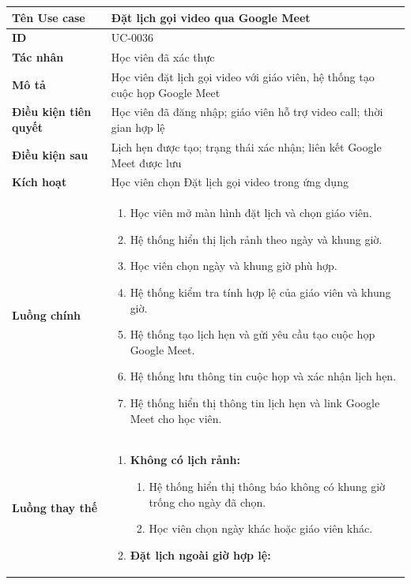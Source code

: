 {
\small
\renewcommand{\arraystretch}{1.15}

\begin{tabularx}{\textwidth}{|>{\raggedright\arraybackslash}p{3.5cm}|>{\raggedright\arraybackslash}X|}
\hline
\textbf{Tên Use case} & Đặt lịch gọi video qua Google Meet \\
\hline
\textbf{ID} & UC-0036 \\
\hline
\textbf{Tác nhân} & Học viên đã xác thực \\
\hline
\textbf{Mô tả} & Học viên đặt lịch gọi video với giáo viên, hệ thống tạo cuộc họp Google Meet \\
\hline
\textbf{Điều kiện tiên quyết} & Học viên đã đăng nhập; giáo viên hỗ trợ video call; thời gian hợp lệ \\
\hline
\textbf{Điều kiện sau} & Lịch hẹn được tạo; trạng thái xác nhận; liên kết Google Meet được lưu \\
\hline
\textbf{Kích hoạt} & Học viên chọn Đặt lịch gọi video trong ứng dụng \\
\hline
\textbf{Luồng chính} &
\begin{enumerate}
    \item Học viên mở màn hình đặt lịch và chọn giáo viên.
    \item Hệ thống hiển thị lịch rảnh theo ngày và khung giờ.
    \item Học viên chọn ngày và khung giờ phù hợp.
    \item Hệ thống kiểm tra tính hợp lệ của giáo viên và khung giờ.
    \item Hệ thống tạo lịch hẹn và gửi yêu cầu tạo cuộc họp Google Meet.
    \item Hệ thống lưu thông tin cuộc họp và xác nhận lịch hẹn.
    \item Hệ thống hiển thị thông tin lịch hẹn và link Google Meet cho học viên.
\end{enumerate} \\
\hline
\textbf{Luồng thay thế} &
\begin{enumerate}
    \item \textbf{Không có lịch rảnh:}
    \begin{enumerate}
        \item[2A.] Hệ thống hiển thị thông báo không có khung giờ trống cho ngày đã chọn.
        \item[3A.] Học viên chọn ngày khác hoặc giáo viên khác.
    \end{enumerate}
    \item \textbf{Đặt lịch ngoài giờ hợp lệ:}

\end{enumerate}
\end{tabularx}}
